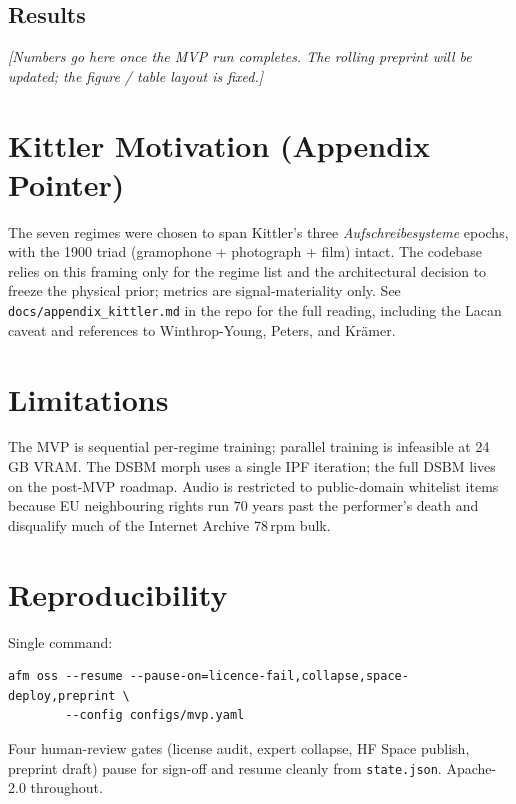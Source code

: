 \documentclass[10pt,a4paper]{article}
\begin{document}
\subsection{Results}
\emph{[Numbers go here once the MVP run completes. The rolling preprint
will be updated; the figure / table layout is fixed.]}

\section{Kittler Motivation (Appendix Pointer)}\label{sec:kittler}
The seven regimes were chosen to span Kittler's three
\emph{Aufschreibesysteme} epochs, with the 1900 triad
(gramophone + photograph + film) intact. The codebase relies on this
framing only for the regime list and the architectural decision to
freeze the physical prior; metrics are signal-materiality only. See
\verb|docs/appendix_kittler.md| in the repo for the full reading,
including the Lacan caveat and references to Winthrop-Young, Peters,
and Kr\"amer.

\section{Limitations}
The MVP is sequential per-regime training; parallel training is
infeasible at 24\,GB VRAM. The DSBM morph uses a single IPF iteration;
the full DSBM lives on the post-MVP roadmap. Audio is restricted to
public-domain whitelist items because EU neighbouring rights run
$70$ years past the performer's death and disqualify much of the
Internet Archive 78\,rpm bulk.

\section{Reproducibility}
Single command:
\begin{verbatim}
afm oss --resume --pause-on=licence-fail,collapse,space-deploy,preprint \
        --config configs/mvp.yaml
\end{verbatim}
Four human-review gates (license audit, expert collapse, HF Space
publish, preprint draft) pause for sign-off and resume cleanly from
\texttt{state.json}. Apache-2.0 throughout.



\end{document}
